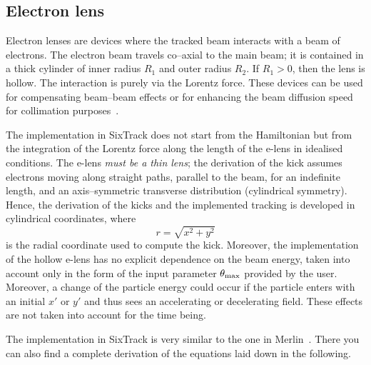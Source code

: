 \documentclass[english]{article}
\begin{document}
\subsection{Electron lens}
\label{elense}
Electron lenses are devices where the tracked beam interacts with a beam of electrons. The electron beam travels co--axial to the main beam; it
is contained in a thick cylinder of inner radius $R_1$ and outer radius $R_2$.
If $R_1>0$, then the lens is hollow. The interaction is purely via the Lorentz
force. These devices can be used for compensating beam--beam effects or for
enhancing the beam diffusion speed for collimation purposes~\cite{Shiltsev:2112966}.

The implementation in SixTrack does not start from the Hamiltonian but from the
integration of the Lorentz force along the length of the e-lens in idealised
conditions. The e-lens \emph{must be a thin lens};
the derivation of the kick assumes electrons moving along straight paths,
parallel to the beam, for an indefinite length, and an axis--symmetric
transverse distribution (cylindrical symmetry). Hence,
the derivation of the kicks and the implemented tracking is developed in cylindrical coordinates, where
\begin{equation}
  r=\sqrt{x^2+y^2}
\end{equation}
is the radial coordinate used to compute the kick. Moreover,
the implementation of the hollow e-lens has no explicit dependence on the
beam energy, taken into account only in the form of the input parameter
$\theta_{\rm max}$ provided by the user. Moreover, a change of the particle
energy could occur if the particle enters with an initial $x'$ or
$y'$ and thus sees an accelerating or decelerating field. These effects
are not taken into account for the time being.

The implementation in SixTrack is very similar to the one in
Merlin~\cite{HReLens}. There you can also find a complete derivation of
the equations laid down in the following.
\end{document}
